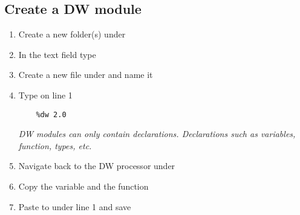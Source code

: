 \subsection{Create a DW module}
\begin{enumerate}
\item Create a new folder(s) under 
\item In the text field type 
\item Create a new file under  and name it 
\item Type on line 1
  \begin{lstlisting}
    %dw 2.0
  \end{lstlisting}
  \emph{
    DW modules can only contain declarations.  Declarations such as variables, function, types, etc.
  }
\item Navigate back to the DW processor under 
\item Copy the  variable and the  function
\item Paste to  under line 1 and save
\end{enumerate}

